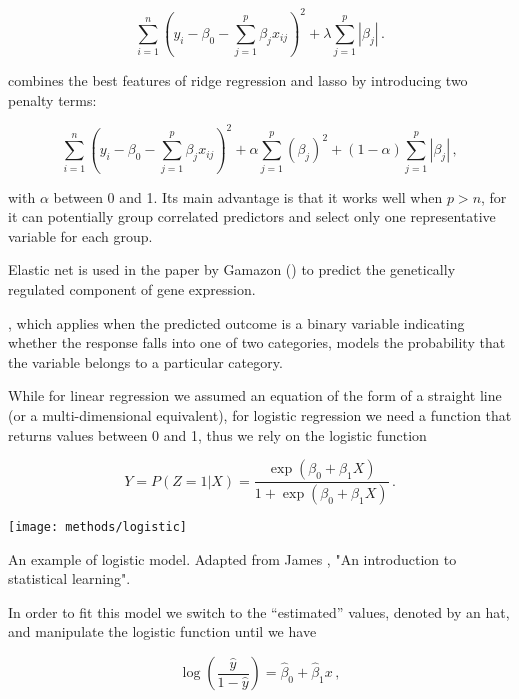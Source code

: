 \documentclass[../main.tex]{subfiles}
\begin{document}
\begin{equation}
	\sum_{i=1}^{n}\left(y_i-\beta_0-\sum_{j=1}^{p}\beta_jx_{ij}\right)^2+
		\lambda\sum_{j=1}^{p}\left|\beta_j\right|\,.
\end{equation}

 combines the best features of 
ridge regression and lasso by introducing two penalty terms:

\begin{equation}
	\sum_{i=1}^{n}\left(y_i-\beta_0-\sum_{j=1}^{p}\beta_jx_{ij}\right)^2+
		\alpha\sum_{j=1}^{p}\left(\beta_j\right)^2+
		(1-\alpha)\sum_{j=1}^{p}\left|\beta_j\right|\,,
\end{equation}

with $\alpha$ between 0 and 1. Its main advantage is that it works well 
when $p>n$, for it can potentially group correlated predictors and 
select only one representative variable for each group.

Elastic net is used in the paper by Gamazon \etal () 
to predict the genetically regulated component of gene expression.

, which applies when the 
predicted outcome is a binary variable indicating whether the response 
falls into one of two categories, models the probability that the 
variable belongs to a particular category.

While for linear regression we assumed an equation of the form of a 
straight line (or a multi-dimensional equivalent), for logistic 
regression we need a function that returns values between 0 and 1, thus 
we rely on the logistic function

\begin{equation}
	Y = P(Z = 1 | X) =
		\frac{\exp(\beta_0+\beta_1X)}{1+\exp(\beta_0+\beta_1X)}\,.
\end{equation}

\begin{marginfigure}[0cm]
	\texttt{[image: methods/logistic]}
	\caption{An example of logistic model. Adapted from James , "An introduction to statistical learning".}
\end{marginfigure}

In order to fit this model we switch to the \enquote{estimated} values, 
denoted by an hat, and manipulate the logistic function until we have

\begin{equation}
	\log\left(\frac{\hat{y}}{1-\hat{y}}\right) =
		\hat{\beta}_0 + \hat{\beta}_1 x\,,
\end{equation}
\end{document}
